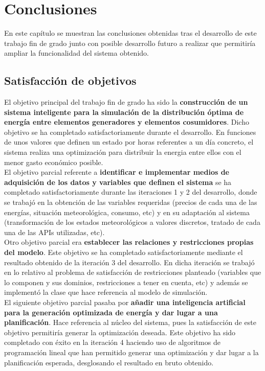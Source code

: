 \chapter{Conclusiones}
\label{cap:Conclusiones}
En este capítulo se muestran las conclusiones obtenidas tras el desarrollo de este trabajo fin de grado junto con posible desarrollo futuro a realizar que permitiría ampliar la funcionalidad del sistema obtenido.\\
\section{Satisfacción de objetivos}
El objetivo principal del trabajo fin de grado ha sido la \textbf{construcción de un sistema inteligente para la simulación de la distribución óptima de energía entre elementos generadores y elementos cosumidores}. Dicho objetivo se ha completado satisfactoriamente durante el desarrollo. En funciones de unos valores que definen un estado por horas referentes a un día concreto, el sistema realiza una optimización para distribuir la energia entre ellos con el menor gasto económico posible.\\

El objetivo parcial referente a \textbf{identificar e implementar medios de adquisición de los datos y variables que definen el sistema} se ha completado satisfactoriamente durante las iteraciones 1 y 2 del desarrollo, donde se trabajó en la obtención de las variables requeridas (precios de cada una de las energías, situación meteorológica, consumo, etc) y en su adaptación al sistema (transformación de los estados meteorológicos a valores discretos, tratado de cada una de las APIs utilizadas, etc).\\

Otro objetivo parcial era \textbf{establecer las relaciones y restricciones propias del modelo}. Este objetivo se ha completado satisfactoriamente mediante el resultado obtenido de la iteración 3 del desarrollo. En dicha iteración se trabajó en lo relativo al problema de satisfacción de restricciones planteado (variables que lo componen y sus dominios, restricciones a tener en cuenta, etc) y además se implementó la clase que hace referencia al modelo de simulación.\\

El siguiente objetivo parcial pasaba por \textbf{añadir una inteligencia artificial para la generación optimizada de energía y dar lugar a una planificación}. Hace referencia al núcleo del sistema, pues la satisfacción de este objetivo permitiría generar la optimización deseada. Este objetivo ha sido completado con éxito en la iteración 4 haciendo uso de algoritmos de programación lineal que han permitido generar una optimización y dar lugar a la planificación esperada, desglosando el resultado en bruto obtenido.\\

